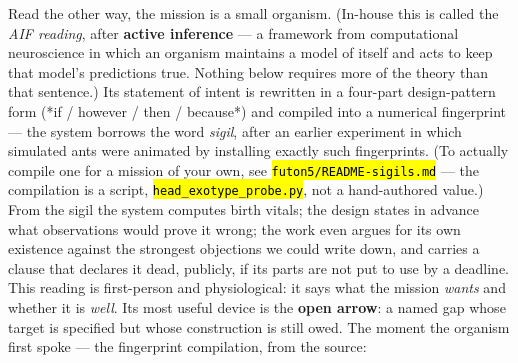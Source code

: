 \documentclass[11pt,oneside]{article}
\newcommand{\scopehl}[1]{\texttt{\hl{#1}}}
\begin{document}
Read the other way, the mission is a small organism. (In-house this is
called the \emph{AIF reading}, after \textbf{active inference} --- a framework from
computational neuroscience in which an organism maintains a model of itself
and acts to keep that model's predictions true. Nothing below requires more
of the theory than that sentence.) Its statement of intent
is rewritten in a four-part design-pattern form (*if / however / then /
because*) and compiled into a numerical fingerprint --- the system borrows the
word \emph{sigil}, after an earlier experiment in which simulated ants were
animated by installing exactly such fingerprints. (To actually compile one for
a mission of your own, see \scopehl{futon5/README-sigils.md} --- the compilation is a
script, \scopehl{head\_exotype\_probe.py}, not a hand-authored value.) From the sigil the system
computes birth vitals; the design states in advance what observations would
prove it wrong; the work even argues for its own existence against the
strongest objections we could write down, and carries a clause that declares
it dead, publicly, if its parts are not put to use by a deadline. This
reading is first-person and physiological: it says what the mission \emph{wants}
and whether it is \emph{well}. Its most useful device is the \textbf{open arrow}: a
named gap whose target is specified but whose construction is still owed.
The moment the organism first spoke --- the fingerprint compilation, from the
source:
\end{document}
